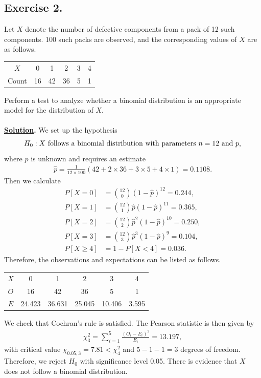 \subsection*{Exercise 2.}

Let $X$ denote the number of defective components from a pack of 12 such components. 100 such packs are observed, and the corresponding values of $X$ are as follows.
\begin{table}[H]
	\centering
	\begin{tabular}{c|ccccc}
		$X$ & 0 & 1 & 2 & 3 & 4 \\
		Count & 16 & 42 & 36 & 5 & 1
	\end{tabular}
\end{table}
Perform a test to analyze whether a binomial distribution is an appropriate model for the distribution of $X$. \\
~\\
\textbf{\underline{Solution}.} We set up the hypothesis
\begin{align*}
H_0: X \mathrm{\ follows\ a\ binomial\ distribution\ with\ parameters\ } n = 12 \mathrm{\ and\ } p,
\end{align*}
where $p$ is unknown and requires an estimate
\begin{align*}
\widehat{p} = \frac{1}{12\times 100}(42 + 2\times 36 + 3\times 5 + 4\times 1) = 0.1108.
\end{align*}
Then we calculate
\begin{align*}
P[X = 0] & = \binom{12}{0}(1-\widehat{p})^{12} = 0.244, \\
P[X = 1] & = \binom{12}{1}\widehat{p}(1-\widehat{p})^{11} = 0.365, \\
P[X = 2] & = \binom{12}{2}\widehat{p}^2(1-\widehat{p})^{10} = 0.250, \\
P[X = 3] & = \binom{12}{3}\widehat{p}^3(1-\widehat{p})^{9} = 0.104, \\
P[X \geq 4] & = 1 - P[X<4] = 0.036.
\end{align*}
Therefore, the observations and expectations can be listed as follows.
\begin{table}[H]
	\centering
	\begin{tabular}{c|ccccc}
		$X$ & 0 & 1 & 2 & 3 & 4 \\
		$O$ & 16 & 42 & 36 & 5 & 1 \\
		$E$ & 24.423 & 36.631 & 25.045 & 10.406 & 3.595
	\end{tabular}
\end{table}
We check that Cochran's rule is satisfied. The Pearson statistic is then given by
\begin{align*}
\chi_{3}^2 = \sum_{i=1}^5 \frac{(O_i - E_i)^2}{E_i} = 13.197,
\end{align*}
with critical value $\chi_{0.05,3} = 7.81 < \chi_{4}^2$ and $5 - 1 - 1 = 3$ degrees of freedom. Therefore, we reject $H_0$ with significance level 0.05. There is evidence that $X$ does not follow a binomial distribution.

